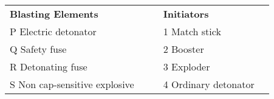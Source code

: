 \begin{tabular}{llcll}
\textbf{Blasting Elements} & & & \textbf{Initiators} \\[6pt]
P \; Electric detonator            & & & 1 \; Match stick \\
Q \; Safety fuse                   & & & 2 \; Booster \\
R \; Detonating fuse               & & & 3 \; Exploder \\
S \; Non cap-sensitive explosive   & & & 4 \; Ordinary detonator \\
\end{tabular}
